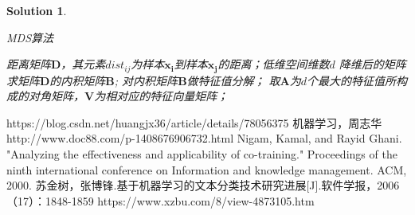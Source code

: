 \documentclass[a4paper,UTF8]{article}
\numberwithin{equation}{section}
\newtheorem*{solution}{Solution}
\begin{document}
\begin{solution}
\begin{enumerate}
	\begin{algorithm}[htbp]  
	    \caption{MDS算法}  
	    \begin{algorithmic}[1] %
	 		\Require 距离矩阵$\mathbf{D}$，其元素$dist_{ij}$为样本$\mathbf{x_i}$到样本$\mathbf{x_j}$的距离；低维空间维数$d$
		    \Ensure 降维后的矩阵
		    \State 求矩阵$\mathbf{D}$的内积矩阵$\mathbf{B}$;
		    \State 对内积矩阵$\mathbf{B}$做特征值分解；
		    \State 取$\mathbf{A}$为$d$个最大的特征值所构成的对角矩阵，$\mathbf{V}$为相对应的特征向量矩阵；
	        \State {}
	   \end{algorithmic}  
	\end{algorithm} 
\end{enumerate}

\end{solution}
\newpage
\begin{thebibliography}{}
 https://blog.csdn.net/huangjx36/article/details/78056375
 机器学习，周志华
 http://www.doc88.com/p-1408676906732.html
 Nigam, Kamal, and Rayid Ghani. "Analyzing the effectiveness and applicability of co-training." Proceedings of the ninth international conference on Information and knowledge management. ACM, 2000.
 苏金树，张博锋.基于机器学习的文本分类技术研究进展[J].软件学报，2006（17）：1848-1859
 https://www.xzbu.com/8/view-4873105.htm
\end{thebibliography}
\end{document}
